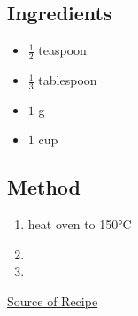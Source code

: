 \documentclass[11pt,a4paper]{article}
\begin{document}
\subsection*{Ingredients}

\begin{multicols}{2}

\begin{itemize}
  \item $ \frac{1}{2} $ teaspoon
  \item $ \frac{1}{3} $ tablespoon
  \item $ 1 $ \si{\gram} 
\end{itemize}

\columnbreak

\begin{itemize}
  \item $ 1 $ cup
\end{itemize}

\end{multicols}

\medskip

\subsection*{Method}

\begin{enumerate}
  \item heat oven to 150\si{\celsius}
  \item \lipsum[2]
  \item \lipsum[3]
\end{enumerate}

\href{https://en.wikipedia.org/wiki/Recipe}{Source of Recipe}
\end{document}
